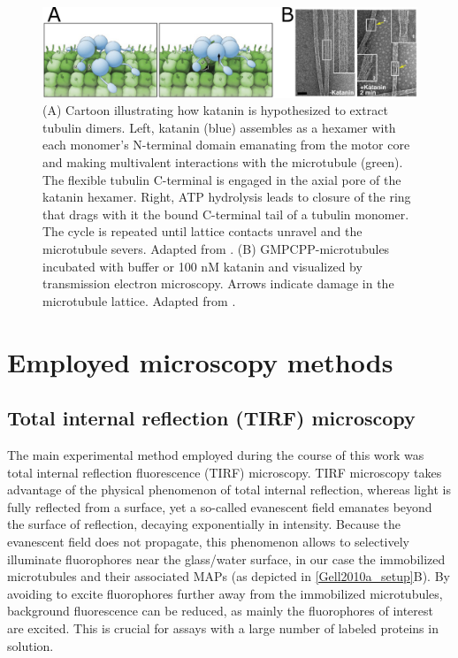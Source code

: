\begin{figure}[h!tb]
\centering
\includegraphics[scale=1.1]{Figures/katanin.png}
\caption[Introduction to katanin.]{
(A) Cartoon illustrating how katanin is hypothesized to extract tubulin dimers. Left, katanin (blue) assembles as a hexamer with each monomer's N-terminal domain emanating from the motor core and making multivalent interactions with the microtubule (green). The flexible tubulin C-terminal is engaged in the axial pore of the katanin hexamer. Right, ATP hydrolysis leads to closure of the ring that drags with it the bound C-terminal tail of a tubulin monomer. The cycle is repeated until lattice contacts unravel and the microtubule severs. Adapted from \cite{Zehr2017}. (B) GMPCPP-microtubules incubated with buffer or 100 nM katanin and visualized by transmission electron microscopy. Arrows indicate damage in the microtubule lattice. Adapted from \cite{Grigorieff2018}.
	}\label{katanin}
\end{figure}

\section{Employed microscopy methods}
\subsection{Total internal reflection (TIRF) microscopy}
The main experimental method employed during the course of this work was total internal reflection fluorescence (TIRF) microscopy. TIRF microscopy takes advantage of the physical phenomenon of total internal reflection, whereas light is fully reflected from a surface, yet a so-called evanescent field emanates beyond the surface of reflection, decaying exponentially in intensity. Because the evanescent field does not propagate, this phenomenon allows to selectively illuminate fluorophores near the glass/water surface, in our case the immobilized microtubules and their associated MAPs (as depicted in \ref{Gell2010a_setup}B). By avoiding to excite fluorophores further away from the immobilized microtubules, background fluorescence can be reduced, as mainly the fluorophores of interest are excited. This is crucial for assays with a large number of labeled proteins in solution. 

